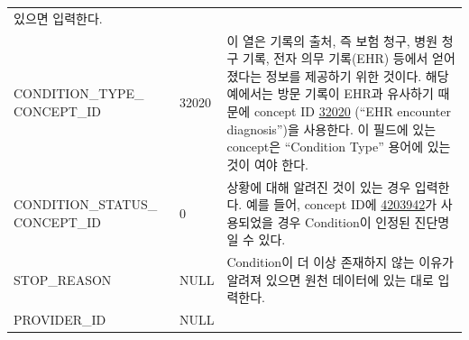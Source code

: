 \documentclass[10.5pt]{book}
\theoremstyle{definition}
\theoremstyle{definition}
\theoremstyle{definition}
\theoremstyle{remark}
\begin{document}
\begin{longtable}[]{@{}lll@{}}
\begin{minipage}[t]{0.48\columnwidth}
있으면 입력한다.\strut
\end{minipage}\tabularnewline
\begin{minipage}[t]{0.28\columnwidth}\raggedright\strut
CONDITION\_TYPE\_ CONCEPT\_ID\strut
\end{minipage} & \begin{minipage}[t]{0.16\columnwidth}\raggedright\strut
32020\strut
\end{minipage} & \begin{minipage}[t]{0.48\columnwidth}\raggedright\strut
이 열은 기록의 출처, 즉 보험 청구, 병원 청구 기록, 전자 의무 기록(EHR)
등에서 얻어졌다는 정보를 제공하기 위한 것이다. 해당 예에서는 방문 기록이
EHR과 유사하기 때문에 concept ID
\href{http://athena.ohdsi.org/search-terms/terms/32020}{32020} (``EHR
encounter diagnosis'')을 사용한다. 이 필드에 있는 concept은 ``Condition
Type'' 용어에 있는 것이 여야 한다.\strut
\end{minipage}\tabularnewline
\begin{minipage}[t]{0.28\columnwidth}\raggedright\strut
CONDITION\_STATUS\_ CONCEPT\_ID\strut
\end{minipage} & \begin{minipage}[t]{0.16\columnwidth}\raggedright\strut
0\strut
\end{minipage} & \begin{minipage}[t]{0.48\columnwidth}\raggedright\strut
상황에 대해 알려진 것이 있는 경우 입력한다. 예를 들어, concept ID에
\href{http://athena.ohdsi.org/search-terms/terms/4203942}{4203942}가
사용되었을 경우 Condition이 인정된 진단명일 수 있다.\strut
\end{minipage}\tabularnewline
\begin{minipage}[t]{0.28\columnwidth}\raggedright\strut
STOP\_REASON\strut
\end{minipage} & \begin{minipage}[t]{0.16\columnwidth}\raggedright\strut
NULL\strut
\end{minipage} & \begin{minipage}[t]{0.48\columnwidth}\raggedright\strut
Condition이 더 이상 존재하지 않는 이유가 알려져 있으면 원천 데이터에
있는 대로 입력한다.\strut
\end{minipage}\tabularnewline
\begin{minipage}[t]{0.28\columnwidth}\raggedright\strut
PROVIDER\_ID\strut
\end{minipage} & \begin{minipage}[t]{0.16\columnwidth}\raggedright\strut
NULL\strut
\end{minipage} & \begin{minipage}[t]{0.48\columnwidth}\raggedright\strut

\end{minipage}
\end{longtable}
\end{document}
